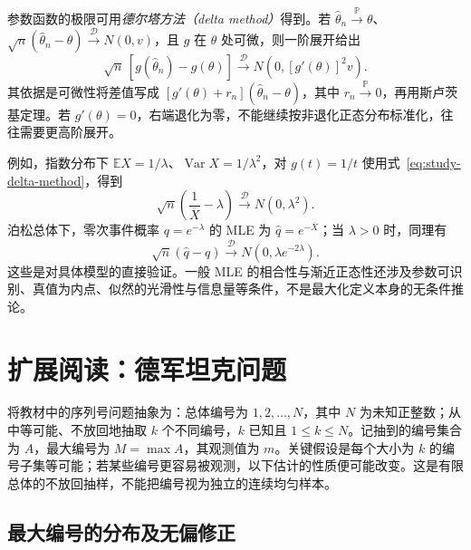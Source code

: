 参数函数的极限可用\emph{德尔塔方法（delta method）}得到。若 $\widehat\theta_n\xrightarrow{\mathbb P}\theta$、$\sqrt n(\widehat\theta_n-\theta)\xrightarrow{\mathcal D}N(0,v)$，且 $g$ 在 $\theta$ 处可微，则一阶展开给出
\begin{equation}
  \sqrt n\,[g(\widehat\theta_n)-g(\theta)]
      \xrightarrow{\mathcal D}
          N\!\left(0,[g'(\theta)]^2v\right).
  \label{eq:study-delta-method}
\end{equation}
其依据是可微性将差值写成 $[g'(\theta)+r_n](\widehat\theta_n-\theta)$，其中 $r_n\xrightarrow{\mathbb P}0$，再用斯卢茨基定理。若 $g'(\theta)=0$，右端退化为零，不能继续按非退化正态分布标准化，往往需要更高阶展开。

例如，指数分布下 $\mathbb E X=1/\lambda$、$\operatorname{Var}X=1/\lambda^2$，对 $g(t)=1/t$ 使用式~\eqref{eq:study-delta-method}，得到
\[
  \sqrt n\left(\frac1{\overline X}-\lambda\right)
      \xrightarrow{\mathcal D}N(0,\lambda^2).
\]
泊松总体下，零次事件概率 $q=e^{-\lambda}$ 的 MLE 为 $\widehat q=e^{-\overline X}$；当 $\lambda>0$ 时，同理有
\[
  \sqrt n(\widehat q-q)
      \xrightarrow{\mathcal D}N(0,\lambda e^{-2\lambda}).
\]
这些是对具体模型的直接验证。一般 MLE 的相合性与渐近正态性还涉及参数可识别、真值为内点、似然的光滑性与信息量等条件，不是最大化定义本身的无条件推论。

\section{扩展阅读：德军坦克问题}
\label{sec:study-german-tank}

将教材中的序列号问题抽象为：总体编号为 $1,2,\ldots,N$，其中 $N$ 为未知正整数；从中等可能、不放回地抽取 $k$ 个不同编号，$k$ 已知且 $1\le k\le N$。记抽到的编号集合为 $A$，最大编号为 $M=\max A$，其观测值为 $m$。关键假设是每个大小为 $k$ 的编号子集等可能；若某些编号更容易被观测，以下估计的性质便可能改变。这是有限总体的不放回抽样，不能把编号视为独立的连续均匀样本。

\subsection{最大编号的分布及无偏修正}

